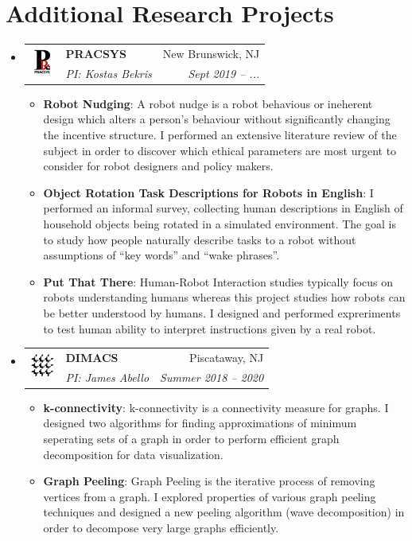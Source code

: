 \documentclass[letterpaper,11pt]{article}
\makeatletter
\newcommand{\resumeItem}[2]{
\item\small{
		\textbf{#1}{: #2 \vspace{-2pt}}
	}
}
\newcommand{\resumeSubheading}[5]{
	\vspace{-1pt}\item
	\begin{tabular*}{0.97\textwidth}[t]{ll@{\extracolsep{\fill}}r}
		\multirow{2}{*}{#1} & \textbf{#2} & #3 \\
				    & \textit{\small#4} & \textit{\small #5} \\
	\end{tabular*}\vspace{-5pt}
}
\newcommand{\resumeSubHeadingListStart}{\begin{itemize}[leftmargin=*,label=]}
\newcommand{\resumeSubHeadingListEnd}{\end{itemize}}
\newcommand{\resumeItemListStart}{\begin{itemize}[label=$\bullet$]}
\newcommand{\resumeItemListEnd}{\end{itemize}\vspace{-5pt}}
\makeatother
\begin{document}
\section{Additional Research Projects}
\resumeSubHeadingListStart
\resumeSubheading
{\includegraphics[width=23pt]{./images/pracsys.png}}
{PRACSYS}{New Brunswick, NJ}
{PI: Kostas Bekris}{Sept 2019 -- ...}
\resumeItemListStart
\resumeItem{Robot Nudging}
{A robot nudge is a robot behavious or ineherent design which alters a person's behaviour without significantly changing the incentive structure. I performed an extensive literature review of the subject in order to discover which ethical parameters are most urgent to consider for robot designers and policy makers.}
\resumeItem{Object Rotation Task Descriptions for Robots in English}
{I performed an informal survey, collecting human descriptions in English of household objects being rotated in a simulated environment. The goal is to study how people naturally describe tasks to a robot without assumptions of ``key words'' and ``wake phrases''.}
\resumeItem{Put That There}
{Human-Robot Interaction studies typically focus on robots understanding humans whereas this project studies how robots can be better understood by humans. I designed and performed expreriments to test human ability to interpret instructions given by a real robot.}
\resumeItemListEnd
\resumeSubheading
{\includegraphics[width=23pt]{./images/dimacs.png}}
{DIMACS}{Piscataway, NJ}
{PI: James Abello}{Summer 2018 -- 2020}
\resumeItemListStart
\resumeItem{k-connectivity}
{k-connectivity is a connectivity measure for graphs. I designed two algorithms for finding approximations of minimum seperating sets of a graph in order to perform efficient graph decomposition for data visualization.}
\resumeItem{Graph Peeling}
{Graph Peeling is the iterative process of removing vertices from a graph. I explored properties of various graph peeling techniques and designed a new peeling algorithm (wave decomposition) in order to decompose very large graphs efficiently.}
\resumeItemListEnd
\resumeSubHeadingListEnd

\end{document}
